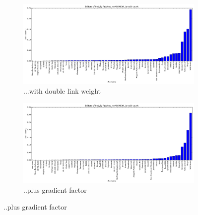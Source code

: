 \begin{figure}[H]
  \begin{subfigure}[b]{0.7\linewidth}
    \centering
    \includegraphics[width=\linewidth]{img/weightings/LudvigFaddeevLinks.png}
    \caption{...with double link weight}
  \end{subfigure}
  \begin{subfigure}[b]{0.7\linewidth}
    \centering
    \includegraphics[width=\linewidth]{img/weightings/LudvigFaddeevLinksGradient.png}
    \caption{..plus gradient factor}
  \end{subfigure}
  
\end{figure}
\clearpage
